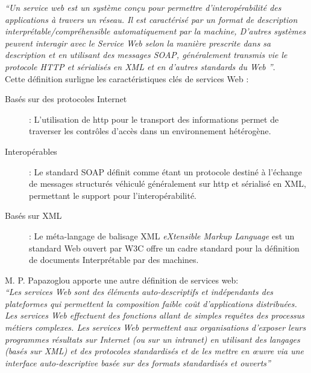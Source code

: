	\emph{``Un service web est un système conçu pour permettre d'interopérabilité des applications à travers un réseau. 
	    Il est caractérisé par un format de description interprétable/compréhensible automatiquement par la machine,
	    D'autres systèmes peuvent interagir avec le Service Web selon la manière prescrite dans sa description et en
	    utilisant des messages SOAP, généralement transmis vie le protocole HTTP et sérialisés en XML et en d'autres 
	    standards du Web ''}.\\

	Cette définition surligne les caractéristiques clés de services Web \cite{fremantle2002enterprise}:

	\SpecialItem
	\begin{description} %
	    \item[Basés sur des protocoles Internet] : 
		L'utilisation de \acrshort{http} pour le transport des informations permet de traverser les contrôles
		d'accès dans un environnement hétérogène.

	    \item[Interopérables] : 
		Le standard \textsc{SOAP} \cite{box2000simple} définit comme étant un protocole destiné à l'échange 
		de messages structurés véhiculé généralement sur \acrshort{http} et sérialisé en \textsc{XML}, 
		permettant le support pour l'interopérabilité.

	    \item[Basés sur XML] : 
		Le méta-langage de balisage \textsc{XML} \textit{eXtensible Markup Language} est un standard Web ouvert 
		par \textsc{W3C} \cite{bray1998extensible} offre un cadre standard pour la définition de documents 
		Interprétable par des machines.
	\end{description}

	M. P. Papazoglou \cite{papazoglou2003service} apporte une autre définition de services web:\\

	\emph{``Les services Web sont des éléments auto-descriptifs et indépendants des plateformes qui permettent 
	    la composition faible coût d’applications distribuées. Les services Web effectuent des fonctions allant 
	    de simples requêtes des processus métiers complexes. Les services Web permettent aux organisations d’exposer 
	    leurs programmes résultats sur Internet (ou sur un intranet) en utilisant des langages (basés sur XML)
	    et des protocoles standardisés et de les mettre en œuvre via une interface auto-descriptive basée sur 
	    des formats standardisés et ouverts''}\\

